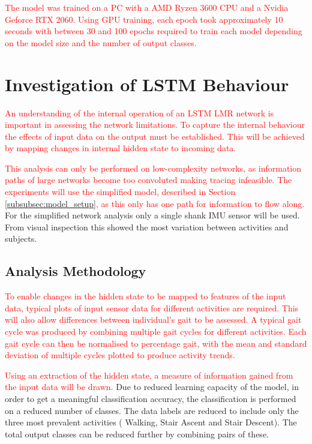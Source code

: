 \documentclass[sensors,article,submit,moreauthors,pdftex]{Definitions/mdpi}
\begin{document}
\textcolor{red}{The model was trained on a PC with a AMD Ryzen 3600 CPU and a Nvidia Geforce RTX 2060. Using GPU training, each epoch took approximately 10 seconds with between 30 and 100 epochs required to train each model depending on the model size and the number of output classes.}


\section{Investigation of LSTM Behaviour}
\label{sec:simplified_model}
\textcolor{red}{}
\textcolor{red}{An understanding of the internal operation of an LSTM LMR network is important in assessing the network limitations. To capture the internal behaviour the effects of input data on the output must be established. This will be achieved by mapping changes in internal hidden state to incoming data.}

\textcolor{red}{This analysis can only be performed on low-complexity networks, as information paths of large networks become too convoluted making tracing infeasible. The experiments will use the simplified model, described in Section \ref{subsubsec:model_setup}, as this only has one path for information to flow along.} For the simplified network analysis only a single shank IMU sensor will be used. From visual inspection this showed the most variation between activities and subjects.

\subsection{Analysis Methodology}
\textcolor{red}{To enable changes in the hidden state to be mapped to features of the input data, typical plots of input sensor data for different activities are required. This will also allow differences between individual's gait to be assessed. A typical gait cycle was produced by combining multiple gait cycles for different activities. Each gait cycle can then be normalised to percentage gait, with the mean and standard deviation of multiple cycles plotted to produce activity trends.}

\textcolor{red}{Using an extraction of the hidden state, a measure of information gained from the input data will be drawn.} Due to reduced learning capacity of the model, in order to get a meaningful classification accuracy, the classification is performed on a reduced number of classes. The data labels are reduced to include only the three most prevalent activities ( Walking, Stair Ascent and Stair Descent). The total output classes can be reduced further by combining pairs of these. 
\end{document}
